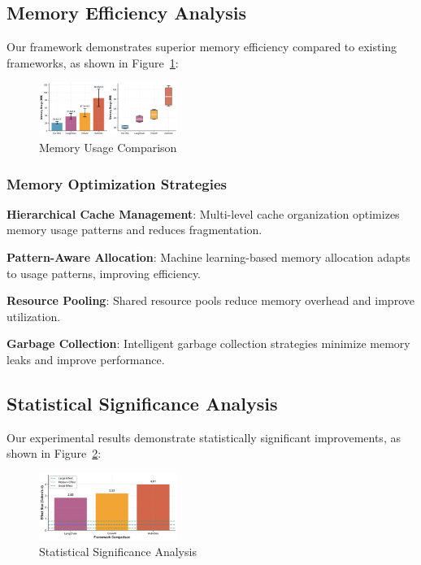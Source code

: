 \documentclass[conference]{IEEEtran}
\begin{document}
\subsection{Memory Efficiency Analysis}

Our framework demonstrates superior memory efficiency compared to existing frameworks, as shown in Figure~\ref{fig:memory1}:

\begin{figure}[htbp]
\centering
\includegraphics[width=0.4\textwidth]{images/memory_comparison.png}
\caption{Memory Usage Comparison}
\label{fig:memory1}
\end{figure}

\subsubsection{Memory Optimization Strategies}

\textbf{Hierarchical Cache Management}: Multi-level cache organization optimizes memory usage patterns and reduces fragmentation.

\textbf{Pattern-Aware Allocation}: Machine learning-based memory allocation adapts to usage patterns, improving efficiency.

\textbf{Resource Pooling}: Shared resource pools reduce memory overhead and improve utilization.

\textbf{Garbage Collection}: Intelligent garbage collection strategies minimize memory leaks and improve performance.

\subsection{Statistical Significance Analysis}

Our experimental results demonstrate statistically significant improvements, as shown in Figure~\ref{fig:statistical}:

\begin{figure}[htbp]
\centering
\includegraphics[width=0.4\textwidth]{images/statistical_analysis.png}
\caption{Statistical Significance Analysis}
\label{fig:statistical}
\end{figure}
\end{document}
